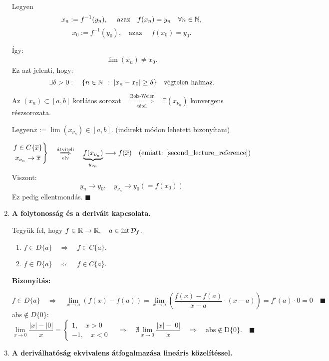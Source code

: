 \documentclass[a4paper,11.5pt]{article}
\DeclareMathOperator{\Int}{int}
\begin{document}
\begin{enumerate}
		Legyen \[x_n:=f^{-1}(y_n),\quad \text{ azaz}\quad  f(x_n)=y_n \quad \forall n\in\mathbb{N},\]
		\[ x_0:=f^{-1}(y_0),\quad \text{azaz }\quad f(x_0)=y_0.\]
		
		Így: \begin{gather}
		\displaystyle \lim(x_n)\not=x_0.\label{second_lecture_reference}
		\end{gather} Ez azt jelenti, hogy:
		\[ \exists\delta>0:\quad \{ n\in\N\ :\ |x_n-x_0|\geq \delta \}\quad \text{végtelen halmaz.} \]
		
		Az $(x_n)\subset[a,b]$ korlátos sorozat$\quad \overset{\text{Bolz-Weier}}{\underset{\text{tétel}}{\Longrightarrow}}\quad \exists (x_{\nu_n})$ konvergens részsorozata.
		
		Legyen\quad  $\overline{x}:=\lim(x_{\nu_n})\in[a,b].$ (indirekt módon lehetett bizonyítani)
		
		\[\left.\begin{gathered}
		f\in C\{\overline{x} \}\\
		x_{\nu_n}\to\overline{x}
		\end{gathered}\right\}\quad \overset{\text{átviteli}}{\underset{\text{elv}}{\Longrightarrow}}\quad \underbrace{f(x_{\nu_n})}_{y_{\nu_n}}\longrightarrow f(\overline{x}) \quad (\text{emiatt: }\ref{second_lecture_reference}) \]
		Viszont:
		\[ y_n\to y_0, \quad y_{\nu_n}\to y_0(=f(x_0)) \]
		Ez pedig ellentmondás. \quad $\blacksquare$
		\item \textbf{A folytonosság és a derivált kapcsolata.}
		
		Tegyük fel, hogy $f\in\R\to\R, \quad a\in\Int\mathcal{D}_f$.
		\begin{enumerate}
			\item $f\in D\{a\}\quad \Rightarrow \quad f\in C\{a\}$.
			\item $f\in D\{a\}\quad \not\Leftarrow \quad f\in C\{a\}$.
		\end{enumerate}
		\textbf{Bizonyítás:}
		
		\fbox{$\Rightarrow$}
		\[ f\in D\{a\}\quad \Rightarrow\quad \lim_{x\to a}(f(x)-f(a))=\lim_{x\to a}\left(\frac{f(x)-f(a)}{x- a}\cdot(x-a)\right)=f'(a)\cdot 0=0\quad \blacksquare \]
		\fbox{$\not\Leftarrow$} abs$\notin D\{0\}:$
		\[\lim_{x\to0}\frac{|x|-|0|}{x}=\left\{
		\begin{gathered}
			1,\quad x>0\\
			-1,\quad x<0
		\end{gathered}\right.\quad  \Rightarrow\quad \nexists\lim_{x\to 0}\frac{|x|-|0|}{x}\quad \Rightarrow\quad \text{abs}\notin\text{D}\{0\}.\quad \blacksquare \]
		\item \textbf{ A deriválhatóság ekvivalens átfogalmazása lineáris közelítéssel.}
		

\end{enumerate}
\end{document}
